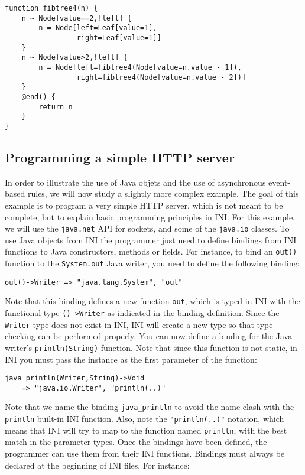 \documentclass[11pt]{article}
\begin{document}
\begin{lstlisting}
function fibtree4(n) {
	n ~ Node[value==2,!left] {
		n = Node[left=Leaf[value=1],
		         right=Leaf[value=1]]
	}
	n ~ Node[value>2,!left] {
		n = Node[left=fibtree4(Node[value=n.value - 1]),
		         right=fibtree4(Node[value=n.value - 2])]
	}
	@end() {
		return n
	}
}
\end{lstlisting}

\subsection{Programming a simple HTTP server}

In order to illustrate the use of Java objets and the use of asynchronous event-based rules, we will now study a slightly more complex example. The goal of this example is to program a very simple HTTP server, which is not meant to be complete, but to explain basic programming principles in INI. For this example, we will use the \texttt{java.net} API for sockets, and some of the \texttt{java.io} classes. To use Java objects from INI the programmer just need to define bindings from INI functions to Java constructors, methods or fields. For instance, to bind an \texttt{out()} function to the \texttt{System.out} Java writer, you need to define the following binding:

\begin{lstlisting}[numbers=none]
out()->Writer => "java.lang.System", "out"
\end{lstlisting}

Note that this binding defines a new function \texttt{out}, which is typed in INI with the functional type \texttt{()->Writer} as indicated in the binding definition. Since the \texttt{Writer} type does not exist in INI, INI will create a new type so that type checking can be performed properly. You can now define a binding for the Java writer's \texttt{println(String)} function. Note that since this function is not static, in INI you must pass the instance as the first parameter of the function:

\begin{lstlisting}[numbers=none]
java_println(Writer,String)->Void
	=> "java.io.Writer", "println(..)"
\end{lstlisting}

Note that we name the binding \texttt{java\_println} to avoid the name clash with the \texttt{println} built-in INI function. Also, note the \texttt{"println(..)"} notation, which means that INI will try to map to the function named \texttt{println}, with the best match in the parameter types. Once the bindings have been defined, the programmer can use them from their INI functions. Bindings must always be declared at the beginning of INI files. For instance:
\end{document}
